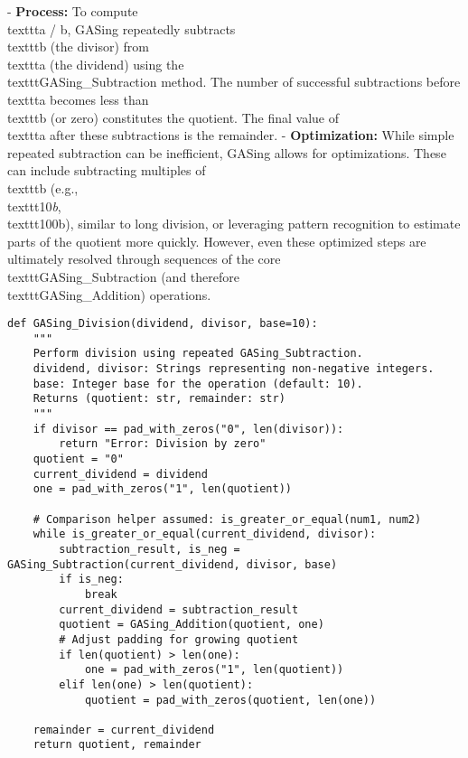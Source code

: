 - \textbf{Process:} To compute \\texttt{a / b}, GASing repeatedly subtracts \\texttt{b} (the divisor) from \\texttt{a} (the dividend) using the \\texttt{GASing\_Subtraction} method. The number of successful subtractions before \\texttt{a} becomes less than \\texttt{b} (or zero) constitutes the quotient. The final value of \\texttt{a} after these subtractions is the remainder.
- \textbf{Optimization:} While simple repeated subtraction can be inefficient, GASing allows for optimizations. These can include subtracting multiples of \\texttt{b} (e.g., \\texttt{10\emph{b}, \\texttt{100}b}), similar to long division, or leveraging pattern recognition to estimate parts of the quotient more quickly. However, even these optimized steps are ultimately resolved through sequences of the core \\texttt{GASing\_Subtraction} (and therefore \\texttt{GASing\_Addition}) operations.

\begin{verbatim}
def GASing_Division(dividend, divisor, base=10):
    """
    Perform division using repeated GASing_Subtraction.
    dividend, divisor: Strings representing non-negative integers.
    base: Integer base for the operation (default: 10).
    Returns (quotient: str, remainder: str)
    """
    if divisor == pad_with_zeros("0", len(divisor)):
        return "Error: Division by zero"
    quotient = "0"
    current_dividend = dividend
    one = pad_with_zeros("1", len(quotient))

    # Comparison helper assumed: is_greater_or_equal(num1, num2)
    while is_greater_or_equal(current_dividend, divisor):
        subtraction_result, is_neg = GASing_Subtraction(current_dividend, divisor, base)
        if is_neg:
            break
        current_dividend = subtraction_result
        quotient = GASing_Addition(quotient, one)
        # Adjust padding for growing quotient
        if len(quotient) > len(one):
            one = pad_with_zeros("1", len(quotient))
        elif len(one) > len(quotient):
            quotient = pad_with_zeros(quotient, len(one))

    remainder = current_dividend
    return quotient, remainder

\end{verbatim}

